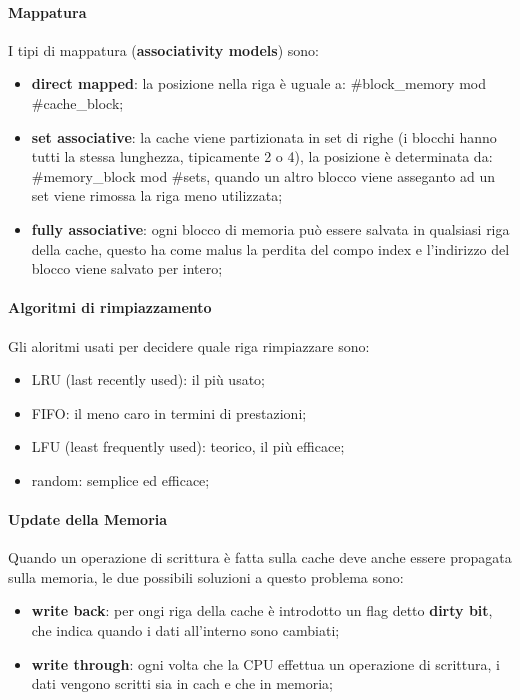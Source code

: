 \documentclass[12pt]{article}
\begin{document}
\paragraph{Mappatura}
I tipi di mappatura (\textbf{associativity models}) sono:
\begin{itemize}
    \item \textbf{direct mapped}: la posizione nella riga \`e uguale a: \#block\_memory mod \#cache\_block;
    \item \textbf{set associative}: la cache viene partizionata in set di righe (i blocchi hanno tutti la stessa lunghezza, tipicamente 2 o 4), la posizione \`e determinata da: \#memory\_block mod \#sets, quando un altro blocco viene asseganto ad un set viene rimossa la riga meno utilizzata;
    \item \textbf{fully associative}: ogni blocco di memoria pu\`o essere salvata in qualsiasi riga della cache, questo ha come malus la perdita del compo index e l'indirizzo del blocco viene salvato per intero;
\end{itemize}

\paragraph{Algoritmi di rimpiazzamento}
Gli aloritmi usati per decidere quale riga rimpiazzare sono:
\begin{itemize}
    \item LRU (last recently used): il pi\`u usato;
    \item FIFO: il meno caro in termini di prestazioni;
    \item LFU (least frequently used): teorico, il pi\`u efficace;
    \item random: semplice ed efficace;
\end{itemize}

\paragraph{Update della Memoria}
Quando un operazione di scrittura \`e fatta sulla cache deve anche essere propagata sulla memoria, le due possibili soluzioni a questo problema sono:
\begin{itemize}
    \item \textbf{write back}: per ongi riga della cache \`e introdotto un flag detto \textbf{dirty bit}, che indica quando i dati all'interno sono cambiati;
    \item \textbf{write through}: ogni volta che la CPU effettua un operazione di scrittura, i dati vengono scritti sia in cach e che in memoria;
\end{itemize}
\end{document}
